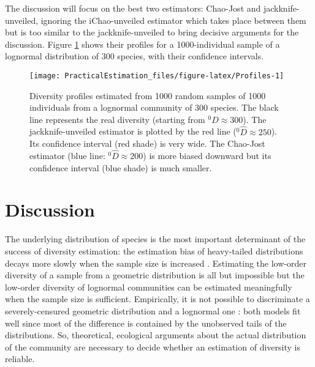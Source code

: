 \documentclass[fleqn,10pt]{latex/stylish_article} %
\begin{document}
The discussion will focus on the best two estimators: Chao-Jost and jackknife-unveiled, ignoring the iChao-unveiled estimator which takes place between them but is too similar to the jackknife-unveiled to bring decisive arguments for the discussion.
Figure \ref{fig:Profiles} shows their profiles for a 1000-individual sample of a lognormal distribution of 300 species, with their confidence intervals.



\scriptsize

\begin{figure}

{\centering \texttt{[image: PracticalEstimation\_files/figure-latex/Profiles-1]} 

}

\caption{Diversity profiles estimated from 1000 random samples of 1000 individuals from a lognormal community of 300 species. The black line represents the real diversity (starting from \(^{0}{D} \approx 300\)). The jackknife-unveiled estimator is plotted by the red line (\(^{0}{\hat{D}} \approx 250\)). Its confidence interval (red shade) is very wide. The Chao-Jost estimator (blue line: \(^{0}{\hat{D}} \approx 200\)) is more biased downward but its confidence interval (blue shade) is much smaller.}\label{fig:Profiles}
\end{figure}

\normalsize

\hypertarget{discussion}{%
\section{Discussion}\label{discussion}}

The underlying distribution of species is the most important determinant of the success of diversity estimation: the estimation bias of heavy-tailed distributions decays more slowly when the sample size is increased \citep{Zhang2013}.
Estimating the low-order diversity of a sample from a geometric distribution is all but impossible \citep{Haegeman2013} but the low-order diversity of lognormal communities can be estimated meaningfully when the sample size is sufficient.
Empirically, it is not possible to discriminate a severely-censured geometric distribution and a lognormal one \citep{Tokeshi1993}: both models fit well since most of the difference is contained by the unobserved tails of the distributions.
So, theoretical, ecological arguments about the actual distribution of the community are necessary to decide whether an estimation of diversity is reliable.
\end{document}
